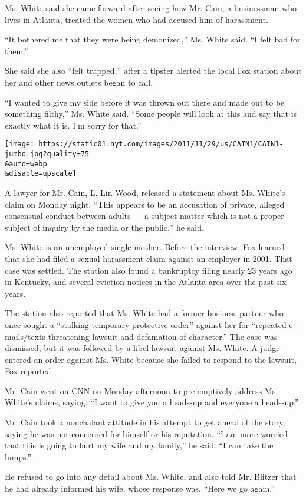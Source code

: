 Ms. White said she came forward after seeing how Mr. Cain, a businessman
who lives in Atlanta, treated the women who had accused him of
harassment.

``It bothered me that they were being demonized,'' Ms. White said. ``I
felt bad for them.''

She said she also ``felt trapped,'' after a tipster alerted the local
Fox station about her and other news outlets began to call.

``I wanted to give my side before it was thrown out there and made out
to be something filthy,'' Ms. White said. ``Some people will look at
this and say that is exactly what it is. I'm sorry for that.''

\texttt{[image: https://static01.nyt.com/images/2011/11/29/us/CAIN1/CAIN1-jumbo.jpg?quality=75\\\&auto=webp\\\&disable=upscale]}

A lawyer for Mr. Cain, L. Lin Wood, released a statement about Ms.
White's claim on Monday night. ``This appears to be an accusation of
private, alleged consensual conduct between adults --- a subject matter
which is not a proper subject of inquiry by the media or the public,''
he said.

Ms. White is an unemployed single mother. Before the interview, Fox
learned that she had filed a sexual harassment claim against an employer
in 2001. That case was settled. The station also found a bankruptcy
filing nearly 23 years ago in Kentucky, and several eviction notices in
the Atlanta area over the past six years.

The station also reported that Ms. White had a former business partner
who once sought a ``stalking temporary protective order'' against her
for ``repeated e-mails/texts threatening lawsuit and defamation of
character.'' The case was dismissed, but it was followed by a libel
lawsuit against Ms. White. A judge entered an order against Ms. White
because she failed to respond to the lawsuit, Fox reported.

Mr. Cain went on CNN on Monday afternoon to pre-emptively address Ms.
White's claims, saying, ``I want to give you a heads-up and everyone a
heads-up.''

Mr. Cain took a nonchalant attitude in his attempt to get ahead of the
story, saying he was not concerned for himself or his reputation. ``I am
more worried that this is going to hurt my wife and my family,'' he
said. ``I can take the lumps.''

He refused to go into any detail about Ms. White, and also told Mr.
Blitzer that he had already informed his wife, whose response was,
``Here we go again.''

